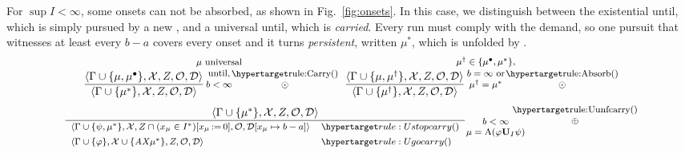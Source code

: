 \noindent
For $\sup I<\infty$, some onsets can not be absorbed, as shown in Fig.~\ref{fig:onsets}. In this case, we distinguish between the existential until, which is simply pursued by a new , and a universal until, which is \emph{carried}. Every run must comply with the demand, so one pursuit that witnesses at least every $b-a$ covers every onset and it turns \emph{persistent}, written $\mu^{\ast}$, which is unfolded by . 
\vspace{-0.2cm}
\[
\footnotesize
\frac{\tup{\Gamma\cup\{\mu,\mu^\bullet\}}{\Ctx}{Z}{\obligations}{\Deadline}}
     {\tup{\Gamma\cup\{\mu^{\ast}\}}{\Ctx}{Z}{\obligations}{\Deadline}}
  \hspace{-0.25cm}
\shortstack{
$\mu$ universal \\ until,\\
$b<\infty$
}
\hspace{-0.33cm}
\shortstack{\ruleanchor{Carry}\\\DETn}
\hspace{0.2cm}
\footnotesize
\frac{\tup{\Gamma\cup\{\mu,\mu^{\dagger}\}}{\Ctx}{Z}{\obligations}{\Deadline}}
     {\tup{\Gamma\cup\{\mu^{\dagger}\}}{\Ctx}{Z}{\obligations}{\Deadline}}
\hspace{-0.37cm}
\raisebox{0ex}{
\shortstack{
$\mu^{\dagger}\in\{\mu^{\bullet},\mu^{\ast}\},$\\
$b=\infty\ \text{or}$\\
$ \mu^{\dagger}=\mu^{\ast}$
}
}
\hspace{-0.4cm}
\shortstack{\ruleanchor{Absorb}\\\DETn}
\]
\vspace{-0.35cm}
\[
\footnotesize
\frac{\tup{\Gamma\cup\{\mu^{\ast}\}}{\Ctx}{Z}{\obligations}{\Deadline}}
{\begin{array}{ll}
\tup{\Gamma\cup\{\psi,\mu^{\ast}\}}{\Ctx}{\rst{Z\cap(x_\mu\in\kIrec)}{x_\mu}}{\obligations}
{\Deadline[x_\mu\mapsto b-a]}
  & \ruleanchor{Ustopcarry}\\[4pt]
\tup{\Gamma\cup\{\varphi\}}{\Ctx\cup\{\AX\mu^{\ast}\}}{Z}{\obligations}{\Deadline}
  & \ruleanchor{Ugocarry}
\end{array}}
\hspace{-0.1cm}
\raisebox{-3ex}{
\shortstack{
$ b<\infty$\\
$\mu=\mathrm{A}(\varphi\mathbf{U}_\kI\psi)$
}
}
\hspace{-0.5cm}
\shortstack{\ruleanchor{Uunfcarry}\\\ORn}
\]
